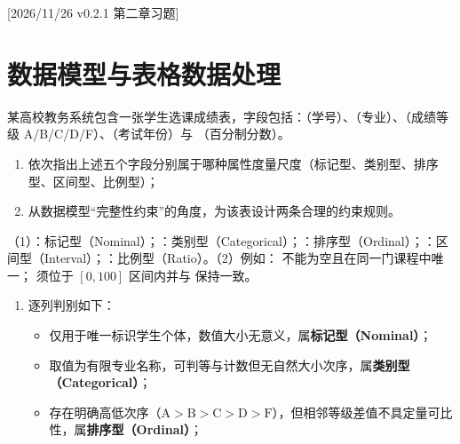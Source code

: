 %
%
[2026/11/26 v0.2.1 第二章习题]
\section{数据模型与表格数据处理}

\begin{exercise}[title={数据模型三要素与属性尺度判别},level=basic,points=10,tags={数据模型,属性尺度,完整性约束}]
某高校教务系统包含一张学生选课成绩表，字段包括：（学号）、（专业）、（成绩等级 A/B/C/D/F）、（考试年份）与 （百分制分数）。
\begin{enumerate}
  \item 依次指出上述五个字段分别属于哪种属性度量尺度（标记型、类别型、排序型、区间型、比例型）；
  \item 从数据模型“完整性约束”的角度，为该表设计两条合理的约束规则。
\end{enumerate}
\begin{answer}
（1）：标记型（Nominal）；：类别型（Categorical）；：排序型（Ordinal）；：区间型（Interval）；：比例型（Ratio）。（2）例如： 不能为空且在同一门课程中唯一； 须位于 $[0,100]$ 区间内并与  保持一致。
\end{answer}
\begin{solution}
\begin{enumerate}
  \item 逐列判别如下：
  \begin{itemize}
    \item {} 仅用于唯一标识学生个体，数值大小无意义，属\textbf{标记型（Nominal）}；
    \item {} 取值为有限专业名称，可判等与计数但无自然大小次序，属\textbf{类别型（Categorical）}；
    \item {} 存在明确高低次序（$\text{A}>\text{B}>\text{C}>\text{D}>\text{F}$），但相邻等级差值不具定量可比性，属\textbf{排序型（Ordinal）}；

\end{itemize}
\end{enumerate}
\end{solution}
\end{exercise}
